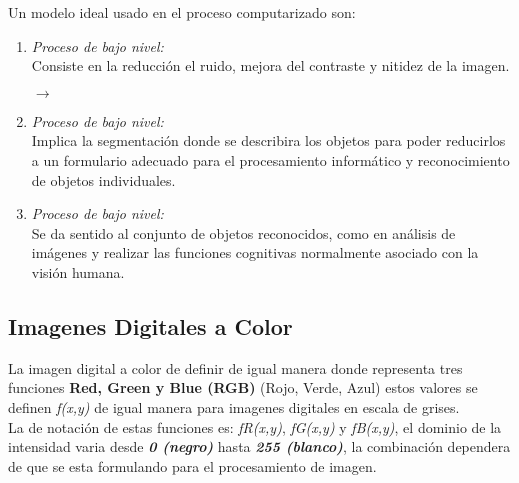 \documentclass[12pt,a4paper]{book}
\begin{document}
Un modelo ideal usado en el proceso computarizado son: 
\begin{enumerate}
   \item [\fbox{1.}]{\em Proceso de bajo nivel:}\\
       Consiste en la reducción el ruido, mejora del contraste y nitidez de la imagen.\\ 
       
       \begin{center}
        $ \longrightarrow$ 
      
       \end{center}
       
   \item [\fbox{2.}]{\em Proceso de bajo nivel:}
   \\ Implica la segmentación donde se describira los objetos para poder reducirlos a un formulario adecuado para el procesamiento informático y reconocimiento de objetos individuales.
   
   
   \item [\fbox{3.}]{\em Proceso de bajo nivel:}\\
  Se da sentido al conjunto de objetos reconocidos, como en análisis de imágenes y realizar las funciones cognitivas normalmente asociado con la visión humana.
\end{enumerate}
\newpage
\subsection{Imagenes Digitales a Color}
La imagen digital a color de definir de igual manera donde representa tres funciones \textbf{Red, Green y Blue (RGB)} (Rojo, Verde, Azul) estos valores se definen \textit{f(x,y)} de igual manera para imagenes digitales en escala de grises.\\
La de notación de estas funciones es: \textit{fR(x,y)}, \textit{fG(x,y)} y \textit{fB(x,y)}, el dominio de la intensidad varia desde \textbf{\textit{0 (negro)}} hasta \textbf{\textit{255 (blanco)}}, la combinación dependera de que se esta formulando para el procesamiento de imagen.
 
   
\vspace{4mm}
\begin{center}
       
\end{center}
\end{document}
